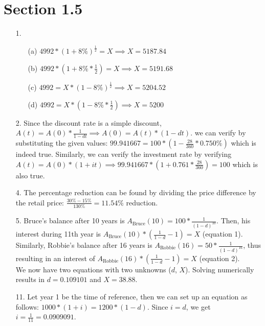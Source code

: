 \documentclass{article}
\begin{document}
\section*{Section 1.5}
\begin{itemize}
      \item [1.]
            \begin{itemize}
                  \item [(a)] $4992*(1+8\%)^{\frac{1}{2}}=X \implies \boxed{X=5187.84}$
                  \item [(b)] $4992*(1+8\%*\frac{1}{2})=X \implies \boxed{X=5191.68}$
                  \item [(c)] $4992=X*(1-8\%)^{\frac{1}{2}} \implies \boxed{X=5204.52}$
                  \item [(d)] $4992=X*(1-8\%*\frac{1}{2}) \implies \boxed{X=5200}$
            \end{itemize}
      \item [2.]
            Since the discount rate is a simple discount, $A(t)=A(0)*\frac{1}{1-dt} \implies A(0)=A(t)*(1-dt)$. we can verify by substituting the given values: $99.941667=100*(1-\frac{28}{360}*0.750\%)$ which is indeed true. Similarly, we can verify the investment rate by verifying $A(t)=A(0)*(1+it) \implies 99.941667*(1+0.761*\frac{28}{360})=100$ which is also true.
      \item [4.]
            The percentage reduction can be found by dividing the price difference by the retail price: $\frac{30\%-15\%}{130\%}=\boxed{11.54\%}$ reduction.
      \item [5.]
            Bruce's balance after 10 years is $A_{\text{Bruce}}(10)=100*\frac{1}{(1-d)^{10}}$. Then, his interest during 11th year is $A_{\text{Bruce}}(10)*(\frac{1}{1-d}-1)=X$ (equation 1). Similarly, Robbie's balance after 16 years is $A_{\text{Robbie}}(16)=50*\frac{1}{(1-d)^{16}}$, thus resulting in an interest of $A_{\text{Robbie}}(16)*(\frac{1}{1-d}-1)=X$ (equation 2).\\
            We now have two equations with two unknowns ($d$, $X$). Solving numerically results in $d=0.109101$ and $\boxed{X=38.88}$.
      \item [11.]
            Let year 1 be the time of reference, then we can set up an equation as follows: $1000*(1+i)=1200*(1-d)$. Since $i=d$, we get $i=\frac{1}{11}=\boxed{0.0909091}$.
\end{itemize}
\end{document}
